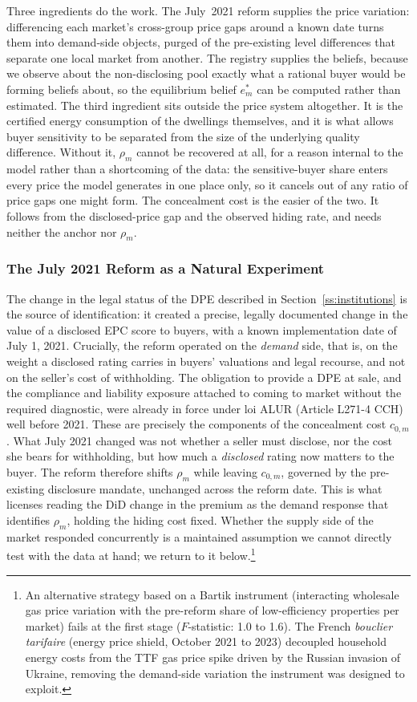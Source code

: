 Three ingredients do the work. The July~2021 reform supplies the price variation: differencing each market's cross-group price gaps around a known date turns them into demand-side objects, purged of the pre-existing level differences that separate one local market from another. The registry supplies the beliefs, because we observe about the non-disclosing pool exactly what a rational buyer would be forming beliefs about, so the equilibrium belief $e^*_m$ can be computed rather than estimated. The third ingredient sits outside the price system altogether. It is the certified energy consumption of the dwellings themselves, and it is what allows buyer sensitivity to be separated from the size of the underlying quality difference. Without it, $\rho_m$ cannot be recovered at all, for a reason internal to the model rather than a shortcoming of the data: the sensitive-buyer share enters every price the model generates in one place only, so it cancels out of any ratio of price gaps one might form. The concealment cost is the easier of the two. It follows from the disclosed-price gap and the observed hiding rate, and needs neither the anchor nor $\rho_m$.

\subsubsection{The July 2021 Reform as a Natural Experiment}

The change in the legal status of the DPE described in Section~\ref{ss:institutions} is the source of identification: it created a precise, legally documented change in the value of a disclosed EPC score to buyers, with a known implementation date of July 1, 2021. Crucially, the reform operated on the \emph{demand} side, that is, on the weight a disclosed rating carries in buyers' valuations and legal recourse, and not on the seller's cost of withholding. The obligation to provide a DPE at sale, and the compliance and liability exposure attached to coming to market without the required diagnostic, were already in force under loi ALUR (Article L271-4 CCH) well before 2021. These are precisely the components of the concealment cost $c_{0,m}$. What July 2021 changed was not whether a seller must disclose, nor the cost she bears for withholding, but how much a \emph{disclosed} rating now matters to the buyer. The reform therefore shifts $\rho_m$ while leaving $c_{0,m}$, governed by the pre-existing disclosure mandate, unchanged across the reform date. This is what licenses reading the DiD change in the premium as the demand response that identifies $\rho_m$, holding the hiding cost fixed. Whether the supply side of the market responded concurrently is a maintained assumption we cannot directly test with the data at hand; we return to it below.\footnote{An alternative strategy based on a Bartik instrument (interacting wholesale gas price variation with the pre-reform share of low-efficiency properties per market) fails at the first stage ($F$-statistic: 1.0 to 1.6). The French \emph{bouclier tarifaire} (energy price shield, October 2021 to 2023) decoupled household energy costs from the TTF gas price spike driven by the Russian invasion of Ukraine, removing the demand-side variation the instrument was designed to exploit.}

